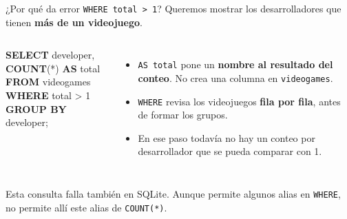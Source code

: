 \documentclass[aspectratio=169,10pt,c]{beamer}
\newcommand{\kw}[1]{\textcolor{utpRojo}{\textbf{#1}}}
\newcommand{\mal}[1]{{\setlength{\fboxsep}{1.2pt}\colorbox{utpRojo!18}{#1}}}
\newenvironment{sqlcode}[1][.86\textwidth]
  {\begin{center}\begin{lrbox}{\sqlbuf}\begin{minipage}{#1}\ttfamily\footnotesize\vspace{6pt}\raggedright}
  {\vspace{6pt}\end{minipage}\end{lrbox}\colorbox{utpGrisClaro}{\usebox{\sqlbuf}}\end{center}}
\begin{document}
\begin{frame}{¿Por qué da error \texttt{WHERE total > 1}?}
\small Queremos mostrar los desarrolladores que tienen \textbf{más de un videojuego}.
\vspace{0.2cm}
\begin{columns}[c,onlytextwidth]
\begin{sqlcode}[\dimexpr\textwidth-2\fboxsep\relax]
\kw{SELECT} developer, \kw{COUNT}(*) \kw{AS} total\\
\kw{FROM} videogames\\
\mal{\kw{WHERE} total > 1}\\
\kw{GROUP BY} developer;
\end{sqlcode}
\small
\begin{itemize}\setlength\itemsep{7pt}
  \item \texttt{AS total} pone un \textbf{nombre al resultado del conteo}. No crea una columna en \texttt{videogames}.
  \item \texttt{WHERE} revisa los videojuegos \textbf{fila por fila}, antes de formar los grupos.
  \item En ese paso todavía no hay un conteo por desarrollador que se pueda comparar con 1.
\end{itemize}
\end{columns}
\vspace{0.2cm}
\vspace{0.1cm}
\footnotesize\color{utpGris} Esta consulta falla también en SQLite. Aunque permite algunos alias en \texttt{WHERE}, no permite allí este alias de \texttt{COUNT(*)}.
\end{frame}
\end{document}
